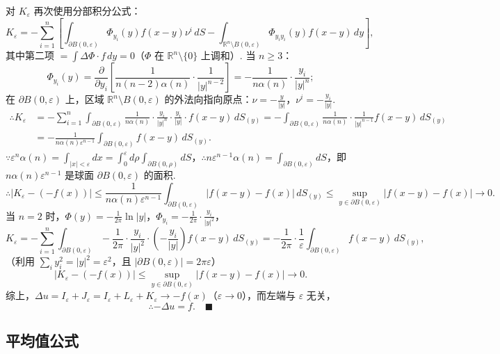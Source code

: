 \documentclass{article}
\begin{document}
对 $K_\varepsilon$ 再次使用分部积分公式：
\[
K_\varepsilon = -\sum_{i=1}^n \left[ \int_{\partial B(0,\varepsilon)} \Phi_{y_i}(y) f(x-y) \nu^i\, dS - \int_{\mathbb{R}^n \setminus B(0,\varepsilon)} \Phi_{y_i y_i}(y) f(x-y)\, dy \right],
\]
其中第二项 $= \int \Delta \Phi \cdot f\, dy = 0$（$\Phi$ 在 $\mathbb{R}^n \setminus \{0\}$ 上调和）.
当 $n \geq 3$：
\[
\Phi_{y_i}(y) = \frac{\partial}{\partial y_i} \left[ \frac{1}{n(n-2)\alpha(n)} \cdot \frac{1}{|y|^{n-2}} \right] = -\frac{1}{n\alpha(n)} \cdot \frac{y_i}{|y|^n};
\]
在 $\partial B(0,\varepsilon)$ 上，区域 $\mathbb{R}^n \setminus B(0,\varepsilon)$ 的外法向指向原点：$\nu = -\frac{y}{|y|}$，$\nu^i = -\frac{y_i}{|y|}$.
\[
\begin{aligned}
	\therefore K_\varepsilon &= -\sum_{i=1}^n \int_{\partial B(0,\varepsilon)} \frac{1}{n\alpha(n)} \cdot \frac{y_i}{|y|^n} \cdot \frac{y_i}{|y|} \cdot f(x-y)\, dS_{(y)} = -\int_{\partial B(0,\varepsilon)} \frac{1}{n\alpha(n)} \cdot \frac{1}{|y|^{n-1}} f(x-y)\, dS_{(y)} \\
	&= -\frac{1}{n\alpha(n) \varepsilon^{n-1}} \int_{\partial B(0,\varepsilon)} f(x-y)\, dS_{(y)}.
\end{aligned}
\]
$\because \varepsilon^n \alpha(n) = \int_{|x|<\varepsilon} dx = \int_0^\varepsilon d\rho \int_{\partial B(0,\rho)} dS$，$\therefore n \varepsilon^{n-1} \alpha(n) = \int_{\partial B(0,\varepsilon)} dS$，即 $n\alpha(n)\varepsilon^{n-1}$ 是球面 $\partial B(0,\varepsilon)$ 的面积.
\[
\therefore |K_\varepsilon - (-f(x))| \leq \frac{1}{n\alpha(n)\varepsilon^{n-1}} \int_{\partial B(0,\varepsilon)} |f(x-y) - f(x)|\, dS_{(y)} \leq \sup_{y \in \partial B(0,\varepsilon)} |f(x-y) - f(x)| \to 0.
\]
当 $n=2$ 时，$\Phi(y) = -\frac{1}{2\pi} \ln|y|$，$\Phi_{y_i} = -\frac{1}{2\pi} \cdot \frac{y_i}{|y|^2}$，
\[
K_\varepsilon = -\sum_{i=1}^n \int_{\partial B(0,\varepsilon)} -\frac{1}{2\pi} \cdot \frac{y_i}{|y|^2} \cdot \left(-\frac{y_i}{|y|}\right) f(x-y)\, dS_{(y)} = -\frac{1}{2\pi} \cdot \frac{1}{\varepsilon} \int_{\partial B(0,\varepsilon)} f(x-y)\, dS_{(y)},
\]
（利用 $\sum_{i} y_i^2 = |y|^2 = \varepsilon^2$，且 $|\partial B(0,\varepsilon)| = 2\pi\varepsilon$）
\[
|K_\varepsilon - (-f(x))| \leq \sup_{y \in \partial B(0,\varepsilon)} |f(x-y) - f(x)| \to 0.
\]
综上，$\Delta u = I_\varepsilon + J_\varepsilon = I_\varepsilon + L_\varepsilon + K_\varepsilon \to -f(x)$（$\varepsilon \to 0$），而左端与 $\varepsilon$ 无关，
\[
\therefore -\Delta u = f. \quad \blacksquare
\]

\subsection{平均值公式}
\end{document}
